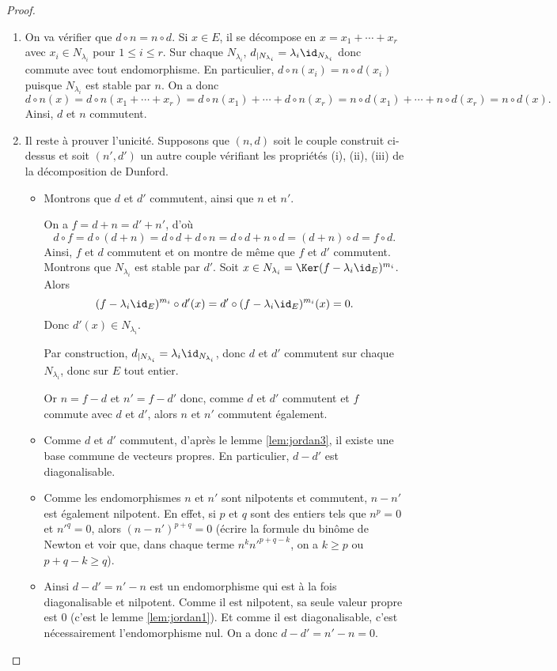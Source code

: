 \documentclass[12pt, class=report,crop=false]{standalone}
\begin{document}
\begin{proof}
\begin{enumerate}
  \item On va vérifier que $d\circ n=n\circ d$. Si $x\in E$, il se décompose
  en $x=x_1+\cdots+x_r$ avec $x_i\in N_{\lambda_i}$ pour $1\le i\le r$.
  Sur chaque $N_{\lambda_i}$, $d_{|N_{\lambda_i}}=\lambda_i\id_{N_{\lambda_i}}$ donc commute avec tout endomorphisme. 
  En particulier, $d\circ n(x_i)=n\circ d(x_i)$ puisque $N_{\lambda_i}$ est stable par $n$. On a donc
  $$d\circ n(x)= d\circ n(x_1+\cdots+x_r)
  =d\circ n(x_1)+\cdots+d\circ n(x_r)=n\circ d(x_1)+\cdots+n\circ d(x_r)=n\circ d(x).$$
  Ainsi, $d$ et $n$ commutent.

  \item  Il reste à prouver l'unicité. Supposons que $(n,d)$ soit le couple construit ci-dessus et soit $(n',d')$ un autre couple vérifiant les propriétés (i), (ii), (iii) de la décomposition de Dunford.
  \begin{itemize}
    \item Montrons que $d$ et $d'$ commutent, ainsi que $n$ et $n'$.
    
    On a $f=d+n=d'+n'$, d'où 
    $$d\circ f=d\circ (d+n) = d\circ d+d\circ n
    =d\circ d+n\circ d = (d+n)\circ d =f\circ d.$$ 
    Ainsi, $f$ et $d$ commutent et on montre de même que $f$ et $d'$ commutent.
    Montrons que $N_{\lambda_i}$ est stable par $d'$. 
    Soit $x\in N_{\lambda_i}= \Ker (f-\lambda_i\id_E)^{m_i}$. Alors
$$(f-\lambda_i\id_E)^{m_i}\circ d'(x)=d'\circ(f-\lambda_i\id_E)^{m_i}(x)=0.$$
Donc $d'(x) \in N_{\lambda_i}$.

    Par construction, $d_{|N_{\lambda_i}}=\lambda_i\id_{N_{\lambda_i}}$, donc $d$ et $d'$ commutent sur chaque 
    $N_{\lambda_i}$, donc sur $E$ tout entier.
    
    Or $n=f-d$ et $n'=f-d'$ donc, comme $d$ et $d'$ commutent et $f$ commute avec $d$ et $d'$, alors $n$ et $n'$ commutent également. 
    
    \item Comme $d$ et $d'$ commutent, d'après le lemme \ref{lem:jordan3}, il existe une base commune de vecteurs propres. En particulier, $d-d'$ est diagonalisable. 
    
    \item Comme les endomorphismes $n$ et $n'$ sont nilpotents et commutent, $n-n'$ est également nilpotent. En effet, si $p$ et $q$ sont des entiers tels que $n^p=0$ et $n'^q=0$, alors $(n-n')^{p+q}=0$ (écrire la formule du binôme de Newton et voir que, dans chaque terme $n^k n'^{p+q-k}$, on a $k \ge p$ ou $p+q-k\ge q$).
    
    
    \item  Ainsi $d-d'=n'-n$ est un endomorphisme qui est à la fois diagonalisable et nilpotent.
    Comme il est nilpotent, sa seule valeur propre est $0$ (c'est le lemme \ref{lem:jordan1}).
    Et comme il est diagonalisable, c'est nécessairement l'endomorphisme nul. On a donc $d-d'=n'-n=0$.
    

\end{itemize}
\end{enumerate}
\end{proof}
\end{document}
